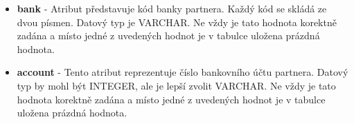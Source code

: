 \documentclass{article}
\begin{document}
\begin{itemize}
	\item \textbf{bank} - Atribut představuje kód banky partnera. Každý kód se skládá ze dvou písmen. Datový typ je VARCHAR. Ne vždy je tato hodnota korektně zadána a místo jedné z uvedených hodnot je v tabulce uložena prázdná hodnota.
	
	\item \textbf{account} - Tento atribut reprezentuje číslo bankovního účtu partnera. Datový typ by mohl být INTEGER, ale je lepší zvolit VARCHAR. Ne vždy je tato hodnota korektně zadána a místo jedné z uvedených hodnot je v tabulce uložena prázdná hodnota.
	
\end{itemize}
\end{document}
